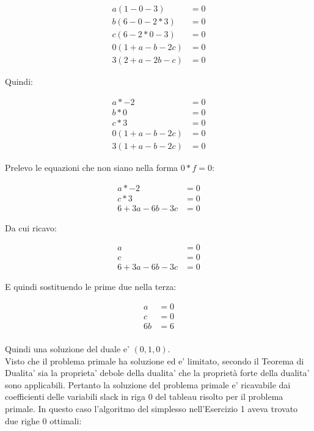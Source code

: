 \documentclass[a4paper,12pt,oneside]{article}
\begin{document}
    \begin{align*}
        a (1 - 0 - 3) & = 0 \\
        b (6 - 0 - 2*3) & = 0 \\
        c (6 - 2*0 - 3) & = 0 \\
        0 (1 + a - b - 2 c) &= 0 \\
        3 (2 + a - 2 b - c) &= 0
    \end{align*}

    Quindi:

    \begin{align*}
        a * -2 & = 0 \\
        b *  0 & = 0 \\
        c *  3 & = 0 \\
        0 (1 + a - b - 2 c) &= 0 \\
        3 (1 + a - b - 2 c) &= 0
    \end{align*}

    Prelevo le equazioni che non siano nella forma $0 * f = 0$:

    \begin{align*}
        a * -2 & = 0 \\
        c *  3 & = 0 \\
        6 + 3a - 6 b - 3 c &= 0
    \end{align*}

    Da cui ricavo:

    \begin{align*}
        a & = 0 \\
        c & = 0 \\
        6 + 3a - 6 b - 3 c &= 0
    \end{align*}

    E quindi sostituendo le prime due nella terza:

    \begin{align*}
        a & = 0 \\
        c & = 0 \\
        6 b &= 6  \\
    \end{align*}

    Quindi una soluzione del duale e' $(0,1,0)$. \\ 
    Visto che il problema primale ha soluzione ed e' limitato, secondo il Teorema di Dualita' sia la proprieta' debole della dualita' che la proprietà forte della dualita' sono applicabili.
    Pertanto la soluzione del problema primale e' ricavabile dai coefficienti delle variabili slack in riga 0 del tableau risolto per il problema primale.
    In questo caso l'algoritmo del simplesso nell'Esercizio 1 aveva trovato due righe 0 ottimali:
\end{document}
